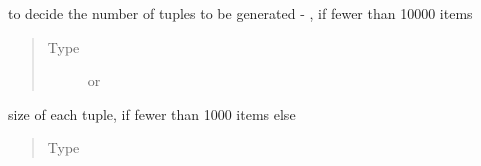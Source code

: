 \documentclass[a4paper,12pt,english]{sphinxmanual}
\begin{document}
\begin{fulllineitems}
\begin{fulllineitems}
\begin{quote}
\begin{description}
\end{description}\end{quote}

\end{fulllineitems}


\begin{fulllineitems}
\label{\detokenize{project_rst/generator:project.generator.DataGenerator.factor}}
to decide the number of tuples to be
generated -  {\hyperref[\detokenize{project_rst/generator:project.generator.DataGenerator.factor}]{}}  {\hyperref[\detokenize{project_rst/generator:project.generator.DataGenerator.items}]{}} \sphinxtitleref{)},
  if fewer than 10000 items
\begin{quote}\begin{description}
\item[{Type}] \leavevmode
{} or 

\end{description}\end{quote}

\end{fulllineitems}


\begin{fulllineitems}
\label{\detokenize{project_rst/generator:project.generator.DataGenerator.tuple_size}}
size of each tuple,   if fewer than 1000
items else 
\begin{quote}\begin{description}
\item[{Type}] \leavevmode
{}

\end{description}\end{quote}


\end{fulllineitems}
\end{fulllineitems}
\end{document}
